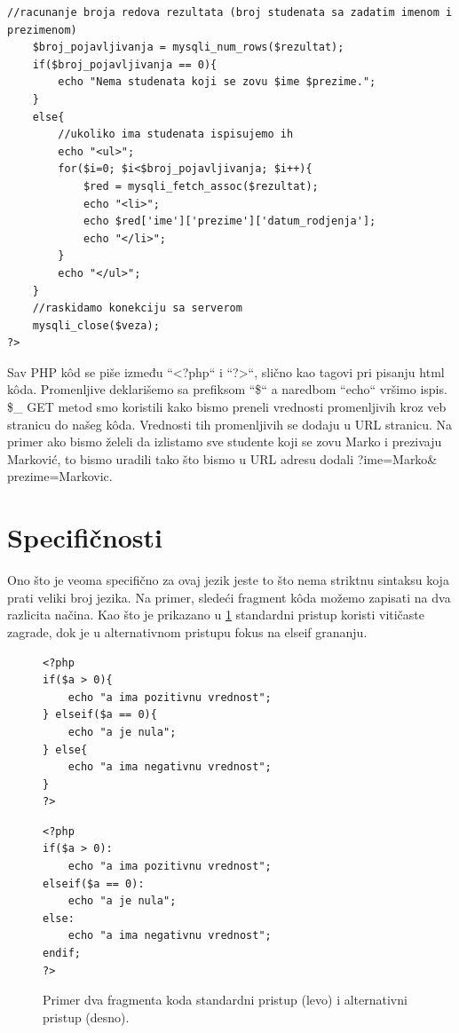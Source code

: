 \documentclass[a4paper]{article}
\begin{document}
{\begin{lstlisting}[caption={Primer PHP k\^{o}da},frame=single, label=primer_koda]
	//racunanje broja redova rezultata (broj studenata sa zadatim imenom i prezimenom)
	$broj_pojavljivanja = mysqli_num_rows($rezultat);
	if($broj_pojavljivanja == 0){
		echo "Nema studenata koji se zovu $ime $prezime.";	
	}
	else{
		//ukoliko ima studenata ispisujemo ih	
		echo "<ul>";
		for($i=0; $i<$broj_pojavljivanja; $i++){
			$red = mysqli_fetch_assoc($rezultat);
			echo "<li>";
			echo $red['ime']['prezime']['datum_rodjenja'];
			echo "</li>";		
		}
		echo "</ul>";
	}
	//raskidamo konekciju sa serverom
	mysqli_close($veza);
?>
\end{lstlisting}
Sav PHP k\^{o}d se piše između “<?php“ i “?>“, slično kao tagovi pri pisanju html k\^{o}da. Promenljive deklarišemo sa prefiksom “\$“ a naredbom “echo“ vršimo ispis. \$\_ GET metod smo koristili kako bismo preneli vrednosti promenljivih kroz veb stranicu do našeg k\^{o}da. Vrednosti tih promenljivih se dodaju u URL stranicu. Na primer ako bismo želeli da izlistamo sve studente koji se zovu Marko i prezivaju Marković, to bismo uradili tako što bismo u URL adresu dodali ?ime=Marko\& prezime=Markovic.

\section{Specifičnosti}

Ono što je veoma specifično za ovaj jezik jeste to što nema striktnu sintaksu koja prati veliki broj jezika. Na primer, sledeći fragment k\^{o}da možemo zapisati na dva razlicita načina. Kao što je prikazano u \ref{fig:stand_alt} standardni pristup koristi vitičaste zagrade, dok je u alternativnom pristupu fokus na elseif grananju. 

\begin{figure}[h]
		\centering
		\begin{minipage}{0.35\textwidth}
\begin{lstlisting}
<?php
if($a > 0){
	echo "a ima pozitivnu vrednost";
} elseif($a == 0){
	echo "a je nula";	
} else{
	echo "a ima negativnu vrednost";	
}
?>	
\end{lstlisting}
		\end{minipage}
		\hfill
		\begin{minipage}{0.35\textwidth}
\begin{lstlisting}
<?php
if($a > 0):
	echo "a ima pozitivnu vrednost";
elseif($a == 0):
	echo "a je nula";	
else:
	echo "a ima negativnu vrednost";	
endif;
?>	
\end{lstlisting}
		\end{minipage}
		\caption{Primer dva fragmenta koda standardni pristup (levo) i alternativni pristup (desno).}
		\label{fig:stand_alt}
\end{figure}



}
\end{document}
